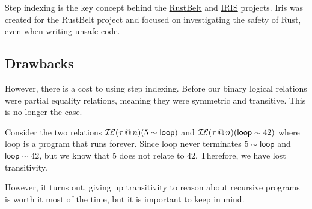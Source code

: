 \documentclass{lecturenotes}
\makeatletter
\newcommand{\inexpr}[4]{\ensuremath{\mathcal{I}\mathcal{E}(#1 \mkern3mu @ \mkern3mu #2)(#3 \sim #4})}
\makeatother
\begin{document}
Step indexing is the key concept behind the \href{https://plv.mpi-sws.org/rustbelt/}{RustBelt} and \href{https://iris-project.org/}{IRIS} projects. 
  Iris was created for the RustBelt project and focused on investigating the safety of Rust, even when writing unsafe code.

\subsection{Drawbacks}

However, there is a cost to using step indexing. 
  Before our binary logical relations were partial equality relations, meaning they were symmetric and transitive. 
  This is no longer the case. 

Consider the two relations $\inexpr{\tau}{n}{5}{\textsf{loop}}$ and $\inexpr{\tau}{n}{\textsf{loop}}{42}$ where \textsf{loop} is a program that runs forever. 
  Since \textsf{loop} never terminates $5 \sim \textsf{loop}$ and $\textsf{loop} \sim 42$, but we know that $5$ does not relate to $42$. 
  Therefore, we have lost transitivity. 

However, it turns out, giving up transitivity to reason about recursive programs is worth it most of the time, but it is important to keep in mind. 
\end{document}
